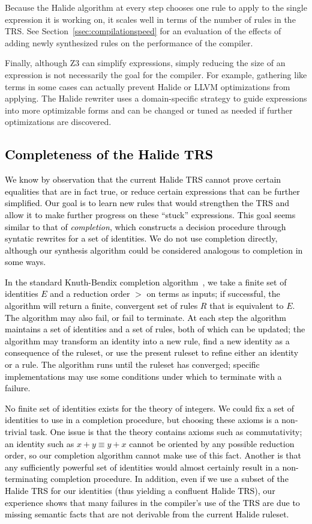\documentclass[acmsmall,review]{acmart}\settopmatter{printfolios=true,printccs=false,printacmref=false}
\newcommand{\modified}[1]{\textcolor{black}{{#1}}}
\begin{document}
Because the Halide algorithm at every step chooses one rule to apply to the single expression it is working on, it scales well in terms of the number of rules in the TRS. See Section~\ref{ssec:compilationspeed} for an evaluation of the effects of adding newly synthesized rules on the performance of the compiler. 

Finally, although Z3 can simplify expressions, simply reducing the size of an expression is not necessarily the goal for the compiler. For example, gathering like terms in some cases can actually prevent Halide or LLVM optimizations from applying. The Halide rewriter uses a domain-specific strategy to guide expressions into more optimizable forms and can be changed or tuned as needed if further optimizations are discovered. 

\subsection{\modified{Completeness of the Halide TRS}}
\label{sec:completion}

\modified{We know by observation that the current Halide TRS cannot prove certain equalities 
that are in fact true, or reduce certain expressions that can be further simplified. 
Our goal is to learn new rules that would strengthen the TRS and allow it to make
further progress on these ``stuck'' expressions. This goal seems similar to that of 
\emph{completion}, which constructs a decision procedure through syntatic rewrites
for a set of identities. We do not use completion directly, although
our synthesis algorithm could be considered analogous to completion in some ways.}

\modified{In the standard Knuth-Bendix completion algorithm~\cite{knuth1983simple}, we take a
finite set of identities $E$ and a reduction order $>$ on terms as inputs; if successful, the
algorithm will return a finite, convergent set of rules $R$ that is equivalent to 
$E$. The algorithm may also fail, or fail to terminate. At each step the algorithm
maintains a set of identities and a set of rules, both of which can be updated; the 
algorithm may transform an identity into a new rule, find a new identity as a 
consequence of the ruleset, or use the present ruleset to refine either an identity 
or a rule. The algorithm runs until the ruleset has converged; specific implementations
may use some conditions under which to terminate with a failure.}

\modified{No finite set of identities exists for the theory of integers. We could
fix a set of identities to use in a completion procedure, but choosing these axioms
is a non-trivial task. One issue is that the theory contains axioms such as commutativity;
an identity such as $x + y \equiv y + x$ cannot be oriented by any possible reduction 
order, so our completion algorithm cannot make use of this fact. Another is that any
sufficiently powerful set of identities would almost certainly result in a non-terminating
completion procedure.  In addition, even if we use a subset of the Halide TRS for our
identities (thus yielding a confluent Halide TRS), our experience shows that many
failures in the compiler's use of the TRS are due to missing semantic facts that are not
derivable from the current Halide ruleset.}
\end{document}
